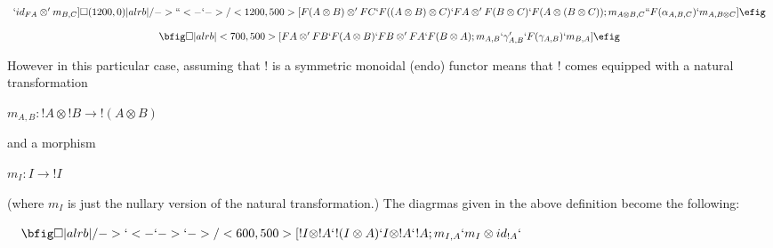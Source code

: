 \begin{definition}
\begin{center}
\begin{math}
\begin{array}{c}
                    `
                    id_{FA} \otimes ' m_{B,C}
                ]
                \square(1200,0)|alrb|/->``<-`->/<1200,500>[
                    F(A \otimes B) \otimes ' FC`
                    F((A \otimes B)\otimes C)`
                    FA \otimes ' F(B \otimes C)`
                    F(A \otimes (B \otimes C));
                    m_{A \otimes B,C}`
                    `
                    F(\alpha_{A,B,C})`
                    m_{A,B \otimes C}
                ]
                \efig
                \\\\
                \bfig
                \square|alrb|<700,500>[
                    FA \otimes ' FB`
                    F(A \otimes B)`
                    FB \otimes ' FA`
                    F(B \otimes A);
                    m_{A,B}`
                    \gamma_{A,B}'`
                    F(\gamma_{A,B})`
                    m_{B,A}
                ]
                \efig
            \end{array}
        \end{math}
    \end{center}
    However in this particular case, assuming that ! is a symmetric monoidal (endo) functor means that ! comes equipped
    with a natural transformation
    \begin{center}
        \begin{math}
            m_{A,B}:!A \otimes !B \rightarrow !(A \otimes B)
        \end{math}
    \end{center}
    and a morphism
    \begin{center}
        \begin{math}
            m_I : I \rightarrow !I
        \end{math}
    \end{center}
    (where $m_I$ is just the nullary version of the natural transformation.)  The diagrmas given in the above definition become
    the following:
    \begin{center}
        \begin{math}
            \begin{array}{c}
                \begin{array}{lr}
                    \bfig
                    \square|alrb|/->`<-`->`->/<600,500>[
                        !I \otimes !A`
                        !(I \otimes A)`
                        I \otimes !A`
                        !A;
                        m_{I,A}`
                        m_{I} \otimes id_{!A}`

\end{array}
\end{array}
\end{math}
\end{center}
\end{definition}
